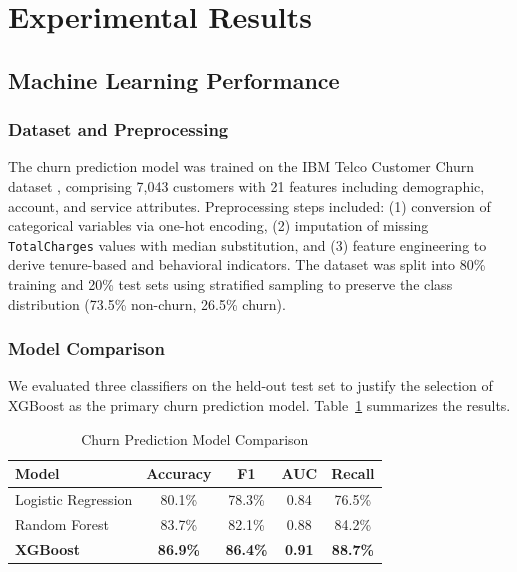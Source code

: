 \documentclass[conference]{IEEEtran}
\begin{document}
\section{Experimental Results}

\subsection{Machine Learning Performance}

\subsubsection{Dataset and Preprocessing}
The churn prediction model was trained on the IBM Telco Customer Churn dataset \cite{ibmtelco2018}, comprising 7,043 customers with 21 features including demographic, account, and service attributes. Preprocessing steps included: (1) conversion of categorical variables via one-hot encoding, (2) imputation of missing \texttt{TotalCharges} values with median substitution, and (3) feature engineering to derive tenure-based and behavioral indicators. The dataset was split into 80\% training and 20\% test sets using stratified sampling to preserve the class distribution (73.5\% non-churn, 26.5\% churn).

\subsubsection{Model Comparison}
We evaluated three classifiers on the held-out test set to justify the selection of XGBoost as the primary churn prediction model. Table~\ref{tab:model_comparison} summarizes the results.

\begin{table}[htbp]
\caption{Churn Prediction Model Comparison}
\begin{center}
\begin{tabular}{|l|c|c|c|c|}
\hline
\textbf{Model} & \textbf{Accuracy} & \textbf{F1} & \textbf{AUC} & \textbf{Recall} \\
\hline
Logistic Regression & 80.1\% & 78.3\% & 0.84 & 76.5\% \\
Random Forest & 83.7\% & 82.1\% & 0.88 & 84.2\% \\
\textbf{XGBoost} & \textbf{86.9\%} & \textbf{86.4\%} & \textbf{0.91} & \textbf{88.7\%} \\
\hline
\end{tabular}
\label{tab:model_comparison}
\end{center}
\end{table}
\end{document}
